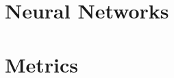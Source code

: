 


\section{Neural Networks}
\label{sec:2_basics/3_neural_networks}



\section{Metrics}
\label{sec:2_basics/4_metrics}


